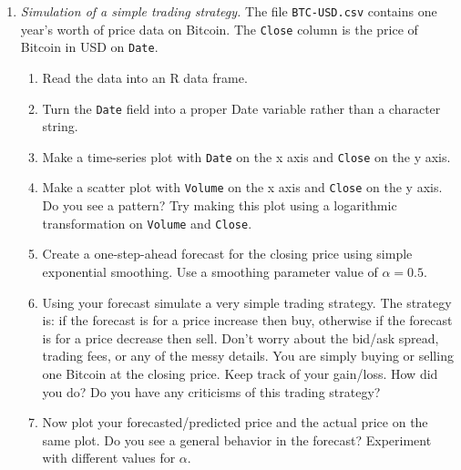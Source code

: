 \begin{enumerate}
\item \emph{Simulation of a simple trading strategy.}
  The file \texttt{BTC-USD.csv} contains one year's worth of price
  data on Bitcoin. The \texttt{Close} column is the price of
  Bitcoin in USD on \texttt{Date}. 

\begin{enumerate}
\item Read the data into an R data frame.
\item Turn the \texttt{Date} field into a proper Date variable rather
  than a character string.
\item Make a time-series plot with \texttt{Date} on the x axis and
  \texttt{Close} on the y axis.
\item Make a scatter plot with \texttt{Volume} on the x axis and
  \texttt{Close} on the y axis. Do you see a pattern? Try making
  this plot using a logarithmic transformation on \texttt{Volume} and
  \texttt{Close}.
\item Create a one-step-ahead forecast for the closing price using
  simple exponential smoothing. Use a smoothing parameter value
  of $\alpha = 0.5$.
\item Using your forecast simulate a very simple trading strategy.
  The strategy is: if the forecast is for a price increase then buy,
  otherwise if the forecast is for a price decrease then sell. Don't
  worry about the bid/ask spread, trading fees, or any of the messy
  details. You are simply buying or selling one Bitcoin at the closing
  price. Keep track of your gain/loss. How did you do? Do you
  have any criticisms of this trading strategy?
\item  Now plot your forecasted/predicted price and the actual price
  on the same plot. Do you see a general behavior in the forecast?
  Experiment with different values for $\alpha$.
\end{enumerate}
  
\end{enumerate}
